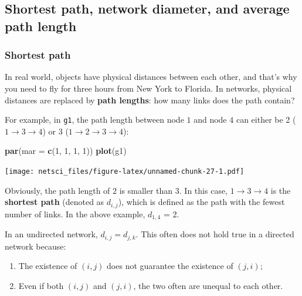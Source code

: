 \documentclass[
]{krantz}
\makeatletter
\newenvironment{Shaded}{\begin{snugshade}}{\end{snugshade}}
\newcommand{\DataTypeTok}[1]{\textcolor[rgb]{0.27,0.27,0.27}{#1}}
\newcommand{\DecValTok}[1]{\textcolor[rgb]{0.06,0.06,0.06}{#1}}
\newcommand{\KeywordTok}[1]{\textcolor[rgb]{0.27,0.27,0.27}{\textbf{#1}}}
\newcommand{\NormalTok}[1]{#1}
\newenvironment{kframe}{%
\medskip{}
\setlength{\fboxsep}{.8em}
 \def\at@end@of@kframe{}%
 \ifinner\ifhmode%
  \def\at@end@of@kframe{\end{minipage}}%
  \begin{minipage}{\columnwidth}%
 \fi\fi%
 \def\FrameCommand##1{\hskip\@totalleftmargin \hskip-\fboxsep
 \colorbox{shadecolor}{##1}\hskip-\fboxsep
     \hskip-\linewidth \hskip-\@totalleftmargin \hskip\columnwidth}%
 \MakeFramed {\advance\hsize-\width
   \@totalleftmargin\z@ \linewidth\hsize
   \@setminipage}}%
 {\par\unskip\endMakeFramed%
 \at@end@of@kframe}
\renewenvironment{Shaded}{\begin{kframe}}{\end{kframe}}
\makeatother
\begin{document}
\hypertarget{shortest-path-network-diameter-and-average-path-length}{%
\subsection{Shortest path, network diameter, and average path length}\label{shortest-path-network-diameter-and-average-path-length}}

\hypertarget{shortest-path}{%
\subsubsection{Shortest path}\label{shortest-path}}

In real world, objects have physical distances between each other, and that's why you need to fly for three hours from New York to Florida. In networks, physical distances are replaced by \textbf{path lengths}: how many links does the path contain?

For example, in \texttt{g1}, the path length between node \(1\) and node \(4\) can either be 2 (\(1 \to 3 \to 4\)) or 3 (\(1 \to 2 \to 3 \to 4\)):

\begin{Shaded}
\begin{Highlighting}[]
\KeywordTok{par}\NormalTok{(}\DataTypeTok{mar =} \KeywordTok{c}\NormalTok{(}\DecValTok{1}\NormalTok{, }\DecValTok{1}\NormalTok{, }\DecValTok{1}\NormalTok{, }\DecValTok{1}\NormalTok{))}
\KeywordTok{plot}\NormalTok{(g1)}
\end{Highlighting}
\end{Shaded}

\texttt{[image: netsci\_files/figure-latex/unnamed-chunk-27-1.pdf]}

Obviously, the path length of \(2\) is smaller than \(3\). In this case, \(1 \to 3 \to 4\) is the \textbf{shortest path} (denoted as \(d_{i,j}\)), which is defined as the path with the fewest number of links. In the above example, \(d_{1,4}\) = 2.

In an undirected network, \(d_{i,j} = d_{j,k}\). This often does not hold true in a directed network because:

\begin{enumerate}
\def\labelenumi{\arabic{enumi}.}
\item
  The existence of \((i, j)\) does not guarantee the existence of \((j, i)\);
\item
  Even if both \((i, j)\) and \((j, i)\), the two often are unequal to each other.
\end{enumerate}
\end{document}
